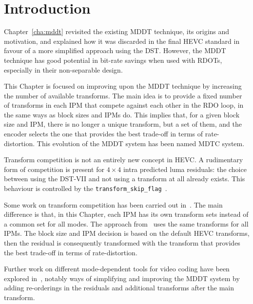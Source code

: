 \documentclass[11pt,a4paper,openright,twoside]{book}
\numberwithin{equation}{section} %
\numberwithin{figure}{section} %
\numberwithin{table}{section} %
\begin{document}
\section{Introduction}
\label{sec:introduction_mdtc}

Chapter~\ref{cha:mddt} revisited the existing \acf{MDDT} technique, its
origins and motivation, and explained how it was discarded in the final
\ac{HEVC} standard in favour of a more simplified approach using the \ac{DST}.
However, the \ac{MDDT} technique has good potential in bit-rate savings when
used with \acp{RDOT}, especially in their non-separable design.

This Chapter is focused on improving upon the \ac{MDDT} technique by
increasing the number of available transforms.
The main idea is to provide a fixed number of transforms in each \acf{IPM}
that compete against each other in the \ac{RDO} loop, in the same ways as
block sizes and \acp{IPM} do.
This implies that, for a given block size and \ac{IPM}, there is no longer a
unique transform, but a set of them, and the encoder selects the one that
provides the best trade-off in terms of rate-distortion.
This evolution of the \ac{MDDT} system has been named \ac{MDTC} system.

Transform competition is not an entirely new concept in \ac{HEVC}.
A rudimentary form of competition is present for $4\times4$ intra predicted
luma residuals:
the choice between using the \ac{DST}-VII and not using a transform at all
already exists.
This behaviour is controlled by the
\texttt{transform\_skip\_flag}~\cite{JCTVC-F077, JCTVC-H0208}.

Some work on transform competition has been carried out
in~\cite{arrufat-14-transform-competition-rdot,fengzou-13-rdot-lloyd-intra}.
The main difference is that, in this Chapter, each \ac{IPM} has its own
transform sets instead of a common set for all modes.
The approach from~\cite{fengzou-13-rdot-lloyd-intra} uses the same transforms
for all \acp{IPM}.
The block size and \ac{IPM} decision is based on the default \ac{HEVC}
transforms, then the residual is consequently transformed with the transform
that provides the best trade-off in terms of rate-distortion.

Further work on different mode-dependent tools for video coding have been
explored in~\cite{ma-13-mode-dependent-tools-video-coding}, notably ways of
simplifying and improving the \ac{MDDT} system by adding re-orderings in the
residuals and additional transforms after the main transform.
\end{document}
